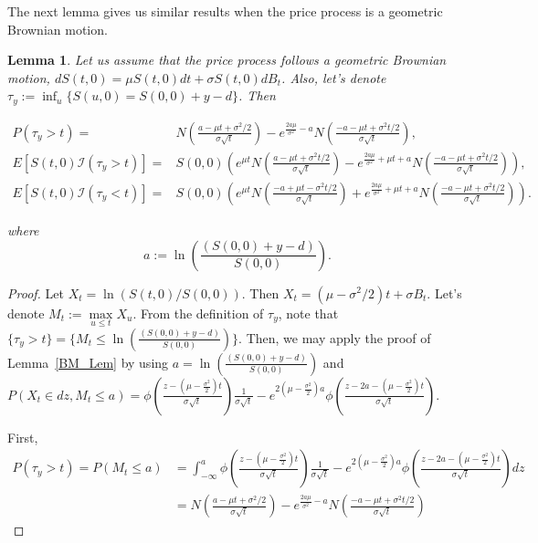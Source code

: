 \documentclass[11pt]{article}
\theoremstyle{plain}
\numberwithin{equation}{section}
\newtheorem{lem}[thm]{Lemma}
\newtheorem{remark}[theorem]{Remark}
\newcommand{\Red}{\color{Red}}
\begin{document}
{{%


The next lemma gives us similar results when the price process is a geometric Brownian motion.

\begin{lem}\label{GBM_Lem}
	Let us assume that the price process follows a geometric Brownian motion, $dS(t,0)=\mu S(t,0) dt + \sigma S(t,0) dB_t $. Also, let's denote $\tau_y:=\inf_{u} \{S(u,0)=S(0,0)+y-d \}$. Then 
	{\Red 
	
	\begin{align*}
		P(\tau_y>t)=&N\left( \frac{a-\mu t+\sigma^2 /2}{\sigma\sqrt{t}} \right)- e^{\frac{2a\mu}{\sigma^2}-a}N\left( \frac{-a-\mu t+\sigma^2 t/2}{\sigma\sqrt{t}} \right),\\
		E[S(t,0) \mathcal{I}(\tau_y>t)]=&S(0,0) \left( e^{\mu t} N\left( \frac{a-\mu t +\sigma^2t/2 }{\sigma\sqrt{t}} \right)-e^{\frac{2a\mu}{\sigma^2}+\mu t + a}N\left(\frac{-a-\mu t +\sigma^2 t/2}{\sigma\sqrt{t}} \right)  \right),\\
		E[S(t,0) \mathcal{I}(\tau_y<t)]=&S(0,0) \left( e^{\mu t} N\left( \frac{-a+\mu t -\sigma^2t/2 }{\sigma\sqrt{t}} \right)+e^{\frac{2a\mu}{\sigma^2}+\mu t + a}N\left(\frac{-a-\mu t +\sigma^2 t/2}{\sigma\sqrt{t}} \right)  \right) .
	\end{align*}
	
	}
	where
	$$a:=\ln \left(\frac{(S(0,0)+y-d)}{S(0,0)}\right).$$
\end{lem}

\begin{proof}
{\Red 
	Let $X_t=\ln (S(t,0)/S(0,0))$. Then $X_t=(\mu-\sigma^2/2) t+\sigma B_t$. 
	Let's denote $M_t:=\max\limits_{u\leq t} X_u$. From the definition of $\tau_y$, note that  $\{\tau_y>t \} =\{ {M_t} \leq \ln \left(\frac{(S(0,0)+y-d)}{S(0,0)}\right)\}$.  
	Then, we may apply the proof of Lemma~\ref{BM_Lem} by using $a=\ln \left(\frac{(S(0,0)+y-d)}{S(0,0)}\right)$ and $P(X_{t}\in dz, M_t\leq a)=\phi\left(\frac{z-(\mu-\frac{\sigma^2}{2}) t}{\sigma\sqrt{t}}\right)\frac{1}{\sigma\sqrt{t}} -e^{2(\mu-\frac{\sigma^2}{2}) a}\phi\left(\frac{z-2a-(\mu-\frac{\sigma^2}{2})t}{\sigma\sqrt{t}}\right).$
	
	First, 
	\begin{align*}
			P(\tau_y>t)= P( M_t \leq a) &= 
		\int_{-\infty}^{a}
		\phi\left(\frac{z-(\mu-\frac{\sigma^2}{2}) t}{\sigma\sqrt{t}}\right)\frac{1}{\sigma\sqrt{t}} -e^{2(\mu-\frac{\sigma^2}{2}) a}\phi\left(\frac{z-2a-(\mu-\frac{\sigma^2}{2})t}{\sigma\sqrt{t}}\right) dz
		\\
		&=N\left( \frac{a-\mu t+\sigma^2 /2}{\sigma\sqrt{t}} \right)- e^{\frac{2a\mu}{\sigma^2}-a}N\left( \frac{-a-\mu t+\sigma^2 t/2}{\sigma\sqrt{t}} \right)
		\end{align*} 

}
\end{proof}}}
\end{document}
